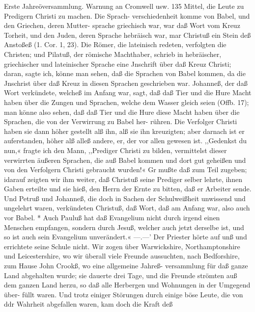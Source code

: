 Erste Jahreöversammlung. Warnung an Cromwell usw. 135
Mittel, die Leute zu Predigern Christi zu machen. Die Sprach-
verschiedenheit komme von Babel, und den Griechen, deren Mutter-
sprache griechisch war, war daß Wort vom Kreuz Torheit, und
den Juden, deren Sprache hebräisch war, mar Christuß ein
Stein deß Anstoßeß (1. Cor. 1, 23). Die Römer, die lateinisch
redeten, verfolgten die Christen; und Pilatuß, der römische
Machthaber, schrieb in hebräischer, griechischer und lateinischer
Sprache eine Jnschrift über daß Kreuz Christi; daran, sagte ich,
könne man sehen, daß die Sprachen von Babel kommen, da die
Jnschrist über daß Kreuz in diesen Sprachen geschrieben war.
Johanneß, der daß Wort verkündete, welcheß im Anfang war,
sagt, daß daß Tier und die Hure Macht haben über die
Zungen und Sprachen, welche dem Wasser gleich seien (Offb. 17);
man könne also sehen, daß daß Tier und die Hure diese Macht
haben über die Sprachen, die von der Verwirrung zu Babel her-
rühren. Die Verfolger Christi haben sie dann höher gestellt alß
ihn, alß sie ihn kreuzigten; aber darnach ist er auferstanden, höher
alß alleß andere, er, der vor allen gewesen ist. ,,Gedenkst du
nun,« fragte ich den Mann, ,,Prediger Christi zu bilden, vermittelst
dieser verwirrten äußeren Sprachen, die auß Babel kommen und
dort gut geheißen und von den Verfolgern Christi gebraucht
wurden!« Gr mußte daß zum Teil zugeben; idarauf zeigten
wir ihm weiter, daß Christuß seine Prediger selber lehrte, ihnen
Gaben erteilte und sie hieß, den Herrn der Ernte zu bitten, daß
er Arbeiter sende. Und Petruß und Johanneß, die doch in Sachen
der Schulweißheit unwissend und ungelehrt waren, verkündeten
Christuß, daß Wort, daß am Anfang war, also auch vor Babel. *
Auch Pauluß hat daß Evangelium nicht durch irgend einen
Menschen empfangen, sondern durch Jesuß, welcher auch jetzt
derselbe ist, und so ist auch sein Evangelium unverändert.« —.—’ Der
Priester hörte auf unß und errichtete seine Schule nicht.
Wir zogen über Warwickshire, Northamptonshire und
Leicestershire, wo wir überall viele Freunde aussuchten, nach
Bedforshire, zum Hause John Crookß, wo eine allgemeine Jahreß-
versammlung für daß ganze Land abgehalten wurde; sie dauerte
drei Tage, und die Freunde strömten auß dem ganzen Land herzu,
so daß alle Herbergen und Wohnungen in der Umgegend über-
füllt waren. Und trotz einiger Störungen durch einige böse Leute,
die von ddr Wahrheit abgefallen waren, kam doch die Kraft deß


